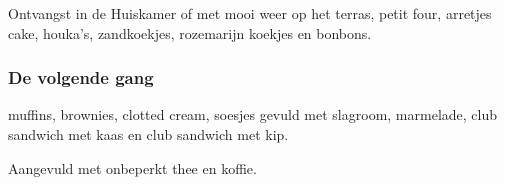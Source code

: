Ontvangst in de Huiskamer of met mooi weer op het terras,
petit four, arretjes cake, houka’s, zandkoekjes, rozemarijn koekjes
en bonbons.

\subsubsection*{De volgende gang}
muffins, brownies, clotted cream, soesjes gevuld met slagroom, marmelade,
club sandwich met kaas en club sandwich met kip.

Aangevuld met onbeperkt thee en koffie.
